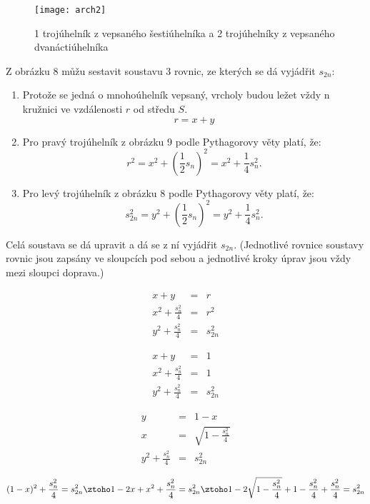 \documentclass[rocnikovka]{gzwroc} %
\begin{document}
\begin{figure}[!ht]
\texttt{[image: arch2]}
\caption{1 trojúhelník z vepsaného šestiúhelníka a 2 trojúhelníky z vepsaného dvanáctiúhelníka}
\label{fig:kruh}
\end{figure}
Z obrázku 8 můžu sestavit soustavu 3 rovnic, ze kterých se dá vyjádřit $s_{2n}$:
\begin{enumerate}
\item Protože se jedná o mnohoúhelník vepsaný, vrcholy budou ležet vždy n kružnici ve vzdálenosti $r$ od středu $S$.
$$
r = x+y
$$
\item Pro pravý trojúhelník z obrázku 9 podle Pythagorovy věty platí, že:
$$
r^2=x^2+\left(\frac{1}{2}s_n\right)^2=x^2+\frac{1}{4}s_n^2.
$$
\item Pro levý trojúhelník z obrázku 8 podle Pythagorovy věty platí, že:
$$
s_{2n}^2=y^2+\left(\frac{1}{2}s_n\right)^2=y^2+\frac{1}{4}s_n^2.
$$
\end{enumerate}
Celá soustava se dá upravit a dá se z ní vyjádřit $s_{2n}$. (Jednotlivé rovnice soustavy rovnic jsou zapsány ve sloupcích pod sebou a jednotlivé kroky úprav jsou vždy mezi sloupci doprava.)
\begin{minipage}[t]{0.3\textwidth}
\begin{eqnarray}
x+y &=& r \nonumber \\
x^2+\frac{s_n^2}{4}&=&r^2\nonumber\\
y^2+\frac{s_n^2}{4}&=&s_{2n}^2\nonumber
\end{eqnarray}
\end{minipage}\hfill
\begin{minipage}[t]{0.3\textwidth}
\begin{eqnarray}
x+y &=& 1 \nonumber \\
x^2+\frac{s_n^2}{4}&=&1\nonumber\\
y^2+\frac{s_n^2}{4}&=&s_{2n}^2\nonumber
\end{eqnarray}
\end{minipage}\hfill
\begin{minipage}[t]{0.3\textwidth}
\begin{eqnarray}
y &=& 1-x \nonumber \\
x&=&\sqrt{1-\frac{s_n^2}{4}}\nonumber\\
y^2+\frac{s_n^2}{4}&=&s_{2n}^2\nonumber
\end{eqnarray}
\end{minipage}\hfill
$$
(1-x)^2+\frac{s_n^2}{4}=s_{2n}^2 \ztoho 1-2x+x^2+\frac{s_n^2}{4}=s_{2n}^2 \ztoho 1-2\sqrt{1-\frac{s_n^2}{4}}+1-\frac{s_n^2}{4}+\frac{s_n^2}{4}=s_{2n}^2
$$
\end{document}
